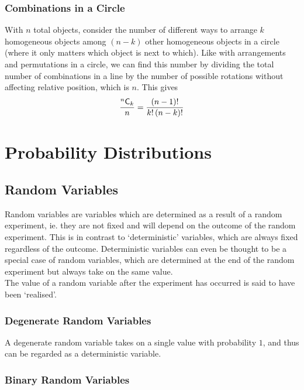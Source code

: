 \documentclass[11pt]{report} %
\begin{document}
\subsubsection{Combinations in a Circle}

With $n$ total objects, consider the number of different ways to arrange $k$ homogeneous objects among $\left(n - k\right)$ other homogeneous objects in a circle (where it only matters which object is next to which). Like with arrangements and permutations in a circle, we can find this number by dividing the total number of combinations in a line by the number of possible rotations without affecting relative position, which is $n$. This gives
\begin{equation}
\dfrac{\mathstrut^{n}\mathsf{C}_{k}}{n} = \dfrac{\left(n - 1\right)!}{k!\left(n - k\right)!}
\end{equation}

\section{Probability Distributions}

\subsection{Random Variables}

Random variables are variables which are determined as a result of a random experiment, ie. they are not fixed and will depend on the outcome of the random experiment. This is in contrast to `deterministic' variables, which are always fixed regardless of the outcome. Deterministic variables can even be thought to be a special case of random variables, which are determined at the end of the random experiment but always take on the same value. \\

The value of a random variable after the experiment has occurred is said to have been `realised'.

\subsubsection{Degenerate Random Variables}

A degenerate random variable takes on a single value with probability $1$, and thus can be regarded as a deterministic variable.

\subsubsection{Binary Random Variables}
\end{document}
